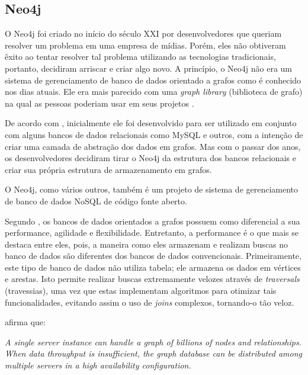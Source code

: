 \subsection{Neo4j}

\par O Neo4j foi criado no início do século XXI por desenvolvedores que queriam resolver um problema em uma empresa de mídias. Porém, eles não obtiveram êxito ao tentar resolver tal problema utilizando as tecnologias tradicionais, portanto, decidiram arriscar e criar algo novo. A princípio, o Neo4j não era um sistema de gerenciamento de banco de dados orientado a grafos como é conhecido nos dias atuais. Ele era mais parecido com uma \textit{graph library} (biblioteca de grafo) na qual as pessoas poderiam usar em seus projetos \cite{bruggen_learning_neo4j}.

\par De acordo com , inicialmente ele foi desenvolvido para ser utilizado em conjunto com alguns bancos de dados relacionais como MySQL e outros, com a intenção de criar uma camada de abstração dos dados em grafos. Mas com o passar dos anos, os desenvolvedores decidiram tirar o Neo4j da estrutura dos bancos relacionais e criar sua própria estrutura de armazenamento em grafos.

\par O Neo4j, como vários outros, também é um projeto de sistema de gerenciamento de banco de dados NoSQL de código fonte aberto.

\par Segundo , os bancos de dados orientados a grafos possuem como diferencial a sua performance, agilidade e flexibilidade. Entretanto, a performance é o que mais se destaca entre eles, pois, a maneira como eles armazenam e realizam buscas no banco de dados são diferentes dos bancos de dados convencionais. Primeiramente, este tipo de banco de dados não utiliza tabela; ele armazena os dados em vértices e arestas. Isto permite realizar buscas extremamente velozes através de \textit{traversals} (travessias), uma vez que estas implementam algoritmos para otimizar tais funcionalidades, evitando assim o uso de \textit{joins} complexos, tornando-o tão veloz.

\par {} afirma que:

\begin{citacao}
	\textit{A single server instance can handle a graph of billions of nodes and relationships. When data throughput is insufficient, the graph database can be distributed among multiple servers in a high availability configuration.}\footnotemark[10]
\end{citacao}

